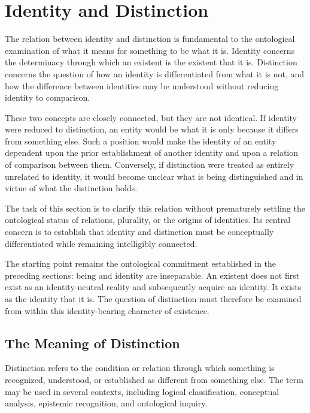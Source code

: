 
\section{Identity and Distinction}
\label{sec:identity-and-distinction}

The relation between identity and distinction is fundamental to the
ontological examination of what it means for something to be what it is.
Identity concerns the determinacy through which an existent is the
existent that it is. Distinction concerns the question of how an identity
is differentiated from what it is not, and how the difference between
identities may be understood without reducing identity to comparison.

These two concepts are closely connected, but they are not identical.
If identity were reduced to distinction, an entity would be what it is
only because it differs from something else. Such a position would make
the identity of an entity dependent upon the prior establishment of
another identity and upon a relation of comparison between them.
Conversely, if distinction were treated as entirely unrelated to identity,
it would become unclear what is being distinguished and in virtue of
what the distinction holds.

The task of this section is to clarify this relation without prematurely
settling the ontological status of relations, plurality, or the origins
of identities. Its central concern is to establish that identity and
distinction must be conceptually differentiated while remaining
intelligibly connected.

The starting point remains the ontological commitment established in
the preceding sections: being and identity are inseparable. An existent
does not first exist as an identity-neutral reality and subsequently
acquire an identity. It exists as the identity that it is. The question
of distinction must therefore be examined from within this
identity-bearing character of existence.

\subsection{The Meaning of Distinction}

Distinction refers to the condition or relation through which something
is recognized, understood, or established as different from something
else. The term may be used in several contexts, including logical
classification, conceptual analysis, epistemic recognition, and
ontological inquiry.

